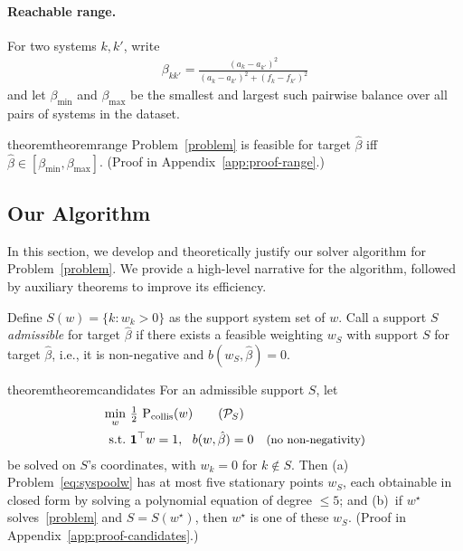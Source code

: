 \documentclass[11pt]{article}
\makeatletter
\newcommand{\qualification}[1]{\ifthmt@thisistheone#1\fi}
\makeatother
\begin{document}
\paragraph{Reachable range.}
For two systems $k,k'$, write
\begin{align}
  \beta_{kk'} = \frac{(a_k-a_{k'})^2}{(a_k-a_{k'})^2+(f_k-f_{k'})^2}\label{eq:bkk}
\end{align}
and let $\beta_{\min}$ and $\beta_{\max}$ be the smallest and largest such pairwise balance over all pairs of systems in the dataset.

\begin{restatable}{theorem}{theoremrange}
\label{thm:range}
Problem~\eqref{problem} is feasible for target $\hat\beta$ iff $\hat\beta \in [\beta_{\min},\beta_{\max}]$. \qualification{ (Proof in Appendix~\ref{app:proof-range}.)}
\end{restatable}

\subsection{Our Algorithm}\label{sec:alg1}

In this section, we develop and theoretically justify our solver algorithm for Problem~\eqref{problem}. We provide a high-level narrative for the algorithm, followed by auxiliary theorems to improve its efficiency.

Define $S(w) = \{k : w_k > 0\}$ as the support system set of $w$.
Call a support $S$ \emph{admissible} for target $\hat\beta$ if there exists a feasible weighting $w_S$ with support $S$ for target $\hat\beta$, i.e., it is non-negative and $b(w_S, \hat\beta) = 0$.

\begin{restatable}{theorem}{theoremcandidates}
For an admissible support $S$, let
\label{thm:candidates}
\begin{align}
  \min_w&\ \tfrac12\ \mathrm{P}_\mathrm{collis}(w) \tag{$\mathcal{P}_S$}\label{eq:syspoolw}\\
  \text{s.t.}&\ \mathbf 1^\top w=1,\ \ b(w,\hat\beta)=0\ \ \ \text{\small(no non-negativity)} \nonumber
\end{align}
 be solved on $S$'s coordinates, with $w_k{=}0$ for $k{\notin}S$. Then (a) Problem~\eqref{eq:syspoolw} has at most five stationary points $w_S$, each obtainable in closed form by solving a polynomial equation of degree $\leq5$; and (b)~if $w^\star$ solves~\eqref{problem} and $S=S(w^\star)$, then $w^\star$ is one of these $w_S$. \qualification{ (Proof in Appendix~\ref{app:proof-candidates}.)}
\end{restatable}
\end{document}
